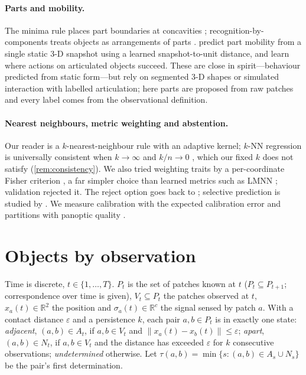 \documentclass[10pt]{article}
\newcommand{\R}{\mathbb{R}}
\begin{document}
\paragraph{Parts and mobility.}
The minima rule places part boundaries at concavities \citep{hoffman1984parts}; recognition-by-components treats objects as arrangements of parts \citep{biederman1987rbc}. \citet{hu2017mobility} predict part mobility from a single static 3-D snapshot using a learned snapshot-to-unit distance, and \citet{mo2021where2act} learn where actions on articulated objects succeed. These are close in spirit---behaviour predicted from static form---but rely on segmented 3-D shapes or simulated interaction with labelled articulation; here parts are proposed from raw patches and every label comes from the observational definition.

\paragraph{Nearest neighbours, metric weighting and abstention.}
Our reader is a $k$-nearest-neighbour rule \citep{cover1967nn} with an adaptive kernel; $k$-NN regression is universally consistent when $k\to\infty$ and $k/n\to0$ \citep{stone1977consistent}, which our fixed $k$ does not satisfy (\cref{rem:consistency}). We also tried weighting traits by a per-coordinate Fisher criterion \citep{fisher1936lda}, a far simpler choice than learned metrics such as LMNN \citep{weinberger2009lmnn}; validation rejected it. The reject option goes back to \citet{chow1970reject}; selective prediction is studied by \citet{geifman2017selective}. We measure calibration with the expected calibration error \citep{guo2017calibration} and partitions with panoptic quality \citep{kirillov2019panoptic}.

\section{Objects by observation}
\label{sec:definition}

Time is discrete, $t\in\{1,\dots,T\}$. $P_t$ is the set of patches known at $t$ ($P_t\subseteq P_{t+1}$; correspondence over time is given), $V_t\subseteq P_t$ the patches observed at $t$, $x_a(t)\in\R^2$ the position and $\sigma_a(t)\in\R^c$ the signal sensed by patch $a$. With a contact distance $\varepsilon$ and a persistence $k$, each pair $a,b\in P_t$ is in exactly one state:
\emph{adjacent}, $(a,b)\in A_t$, if $a,b\in V_t$ and $\lVert x_a(t)-x_b(t)\rVert\le\varepsilon$;
\emph{apart}, $(a,b)\in N_t$, if $a,b\in V_t$ and the distance has exceeded $\varepsilon$ for $k$ consecutive observations;
\emph{undetermined} otherwise. Let $\tau(a,b)=\min\{s:(a,b)\in A_s\cup N_s\}$ be the pair's first determination.
\end{document}
